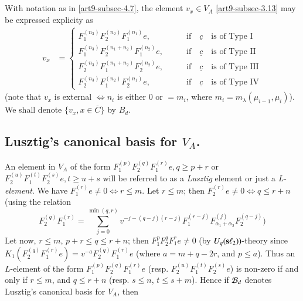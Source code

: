 \subsection{}\label{art9-subsec-4.8}
With notation as in \ref{art9-subsec-4.7}, the element $v_{x}\in V_{A}$ \eqref{art9-subsec-3.13} may be expressed explicity as
\begin{align*}
v_{x} &=
\begin{cases}
F_{1}^{(n_{3})} F_{2}^{(n_{2})}F_{1}^{(n_{1})} e,\qquad &\text{if}\quad \underline{c}\quad \text{is of  Type I}\\
F_{1}^{(n_{3})} F_{2}^{(n_{1}+n_{2})}F_{1}^{(n_{2})} e,\qquad &\text{if}\quad \underline{c} \quad\text{is of  Type II}\\
F_{2}^{(n_{3})} F_{1}^{(n_{1}+n_{2})}F_{2}^{(n_{2})} e,\qquad &\text{if}\quad \underline{c}\quad \text{is of  Type III}\\
F_{2}^{(n_{3})} F_{1}^{(n_{2})}F_{2}^{(n_{1})} e,\qquad &\text{if}\quad \underline{c}\quad \text{is of  Type IV}
\end{cases}
\end{align*}
(note that $v_{x}$ is external $\Longleftrightarrow  n_{i}$ is either 0 or $= m_{i}$, where $m_{i}= m_{\lambda}(\mu_{i-1}, \mu_{i})$). We shall denote $\{v_{x}, x  \in \overline{C}\}$ by $B_{d}$. 

\subsection{Lusztig's canonical basis for $V_{A}$.}\label{art9-subsec-4.9}
An element in $V_{A}$ of the form $F_{1}^{(p)} F_{2}^{(q)}F_{1}^{(r)}e, q\geq p+r$ or $F_{2}^{(u)} F_{1}^{(t)}F_{2}^{(s)} e, t\geq u + s$ will be referred to as a \textit{Lusztig} element or just a \textit{L-element}. We have $F_{1}^{(r)} e \neq 0 \Longleftrightarrow r \leq m$. Let $r \leq m$; then $F_{2}^{(r)} e \neq 0 \Longleftrightarrow q \leq r + n$ (using the relation
$$
F_{2}^{(q)}F_{1}^{(r)} = \sum\limits_{j=0}^{\min(q,r)} v^{-j-(q-j)(r-j)}F_{1}^{(r-j)}F_{\alpha_{1}+ \alpha_{2}}^{(j)} F_{2}^{(q-j)})
$$
Let now, $r \leq m$, $p+r \leq q \leq r +n$; then $F_{1}^{p} F_{2}^{q}F_{1}^{r} e \neq 0$ (by $U_{q}(\mathbf{s}\ell_{2}))$-theory since $K_{1}(F_{2}^{(q)}F_{1}^{(r)}e) = v^{-a}F_{2}^{(q)}F_{1}^{(r)} e$ (where $a=m+q-2r$, and $ p\leq a$). Thus an $L$-element of the form $F_{1}^{(p)}F_{2}^{(q)}F_{1}^{(r)}e$ (resp. $F_{2}^{(u)}F_{1}^{(t)}F_{2}^{(s)}e$) is non-zero if and only if $r\leq m$, and $q \leq r+n$ (resp. $s \leq n$, $t \leq s+m$). Hence if $\mathcal{B}_{d}$ denotes Lusztig's canonical basis for $V_{A}$, then

